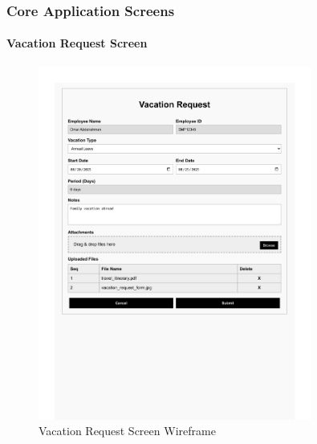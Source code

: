 \documentclass[12pt,a4paper]{article}
\begin{document}
\subsubsection{Core Application Screens}

\paragraph{Vacation Request Screen}
\begin{figure}[H]
\centering
\includegraphics[width=0.8\textwidth]{Wireframes/Vacation-Request/Vacation-Request-1.png}
\caption{Vacation Request Screen Wireframe}
\label{fig:wireframe-vacation-request}
\end{figure}
\end{document}
